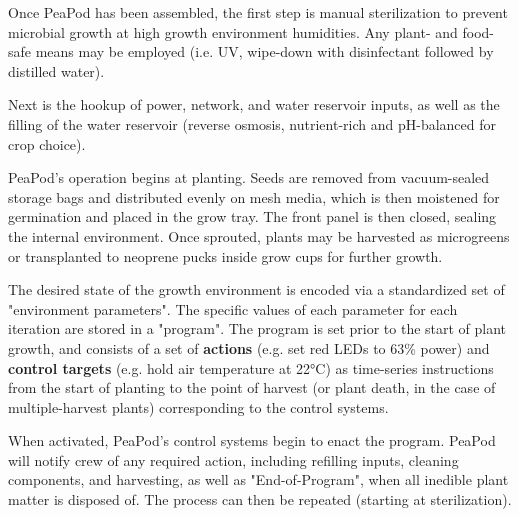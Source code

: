 Once PeaPod has been assembled, the first step is manual sterilization to prevent microbial growth at high growth environment humidities. Any plant- and food-safe means may be employed (i.e. UV, wipe-down with disinfectant followed by distilled water).

Next is the hookup of power, network, and water reservoir inputs, as well as the filling of the water reservoir (reverse osmosis, nutrient-rich and pH-balanced for crop choice).

PeaPod's operation begins at planting. Seeds are removed from vacuum-sealed storage bags and distributed evenly on mesh media, which is then moistened for germination and placed in the grow tray. The front panel is then closed, sealing the internal environment. Once sprouted, plants may be harvested as microgreens or transplanted to neoprene pucks inside grow cups for further growth.

The desired state of the growth environment is encoded via a standardized set of "environment parameters". The specific values of each parameter for each iteration are stored in a "program". The program is set prior to the start of plant growth, and consists of a set of \textbf{actions} (e.g. set red LEDs to 63\% power) and \textbf{control targets} (e.g. hold air temperature at 22°C) as time-series instructions from the start of planting to the point of harvest (or plant death, in the case of multiple-harvest plants) corresponding to the control systems.

When activated, PeaPod's control systems begin to enact the program. PeaPod will notify crew of any required action, including refilling inputs, cleaning components, and harvesting, as well as "End-of-Program", when all inedible plant matter is disposed of. The process can then be repeated (starting at sterilization).
